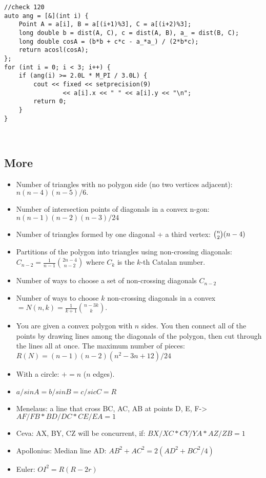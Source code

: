 \documentclass[11pt,a4paper]{article}
\begin{document}
\begin{multicols*}{2}
\begin{lstlisting}
//check 120
auto ang = [&](int i) {
    Point A = a[i], B = a[(i+1)%3], C = a[(i+2)%3];
    long double b = dist(A, C), c = dist(A, B), a_ = dist(B, C);
    long double cosA = (b*b + c*c - a_*a_) / (2*b*c);
    return acosl(cosA);
};
for (int i = 0; i < 3; i++) {
    if (ang(i) >= 2.0L * M_PI / 3.0L) {
        cout << fixed << setprecision(9)
                << a[i].x << " " << a[i].y << "\n";
        return 0;
    }
}



\end{lstlisting}
\subsection{More}
\begin{itemize}
    \item Number of triangles with no polygon side (no two vertices adjacent): $n( n - 4 )( n - 5 ) / 6.$
    \item Number of intersection points of diagonals in a convex n-gon: $n(n-1)(n-2)(n-3) / 24$
    \item Number of triangles formed by one diagonal + a third vertex: $\tbinom{n}{2} (n - 4)$
    \item Partitions of the polygon into triangles using non-crossing diagonals: $C_{n-2} = \frac{1}{n - 1} \binom{2n - 4}{n - 2}$ where $C_k$ is the $k$-th Catalan number.
    \item Number of ways to choose a set of non-crossing diagonals $C_{n - 2}$
    \item Number of ways to choose $k$ non-crossing diagonals in a convex $= N(n, k) = \frac{1}{k + 1} \binom{n - 3k}{k}.$
    \item You are given a convex polygon with $n$ sides. You then connect all of the points by drawing lines among the diagonals of the polygon, then cut through the lines all at once. The maximum number of pieces: $R(N) = (n - 1)(n - 2)(n^2 - 3n + 12)/24$
    \item With a circle: $+= n$ ($n$ edges).
    \item $a/sinA = b/sinB = c/sicC = R$
    \item Menelaus: a line that cross BC, AC, AB at points D, E, F-> $ AF/FB * BD/DC * CE/EA = 1$
    \item Ceva: AX, BY, CZ will be concurrent, if: $BX/XC * CY/YA * AZ/ZB = 1$
    \item Apollonius: Median line AD: $AB^2 + AC^2 = 2(AD^2 + BC^2/4)$
    \item Euler: $OI^2 = R(R - 2r)$

\end{itemize}
\end{multicols*}
\end{document}

